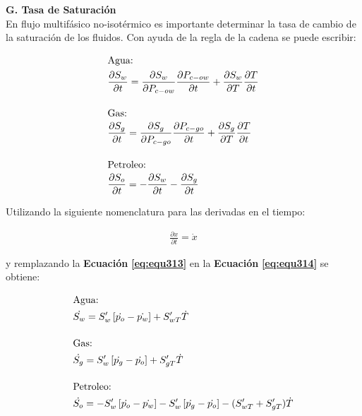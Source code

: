 \textbf{G. Tasa de Saturación}
\\
En flujo multifásico no-isotérmico es importante determinar la tasa de cambio de la saturación de los fluidos. Con ayuda de la regla de la cadena se puede escribir:

\begin{ceqn} 
\begin{subequations} \label{eq:equ314} 
\begin{align}
\shortintertext{Agua:} &\frac{\partial S_w}{\partial t} = \frac{\partial S_w}{\partial P_{c-ow}}\frac{\partial P_{c-ow}}{\partial t} + \frac{\partial S_w}{\partial T}\frac{\partial T}{\partial t}
\label{eq:equ326a} \\[10pt]
\shortintertext{Gas:} 			&\frac{\partial S_g}{\partial t} = \frac{\partial S_g}{\partial P_{c-go}}\frac{\partial P_{c-go}}{\partial t} + \frac{\partial S_g}{\partial T}\frac{\partial T}{\partial t}
\label{eq:equ314b} \\[10pt]
\shortintertext{Petroleo:} 			&\frac{\partial S_o}{\partial t} = -\frac{\partial S_w}{\partial t} -\frac{\partial S_g}{\partial t} \label{eq:equ314b}
\end{align}
\end{subequations} 
\end{ceqn}
\bigskip
Utilizando la siguiente nomenclatura para las derivadas en el tiempo:

\begin{ceqn} 
\begin{gather} \label{eq:equ315} 
\frac{\partial x}{\partial t} = \dot{x}
\end{gather}  
\end{ceqn}

\bigskip
y remplazando la \textbf{Ecuación} \textbf{\ref{eq:equ313}} en la \textbf{Ecuación} \textbf{\ref{eq:equ314}} se obtiene:

\begin{ceqn} 
\begin{subequations} \label{eq:equ316} 
\begin{align}
\shortintertext{Agua:}     &\dot{S_w} = S'_w\left[\dot{p_o} - \dot{p_w} \right] +S'_{wT}\dot{T} \label{eq:equ316a} \\[10pt]
\shortintertext{Gas:} 	&\dot{S_g} = S'_w\left[\dot{p_g} - \dot{p_o} \right] +S'_{gT}\dot{T} \label{eq:equ316b} \\[10pt]
\shortintertext{Petroleo:} 	&\dot{S_o} = -S'_w\left[\dot{p_o} - \dot{p_w} \right] - S'_w\left[\dot{p_g} - \dot{p_o} \right] -(S'_{wT}+S'_{gT}) \dot{T}  \label{eq:equ316c}
\end{align}
\end{subequations} 
\end{ceqn}

